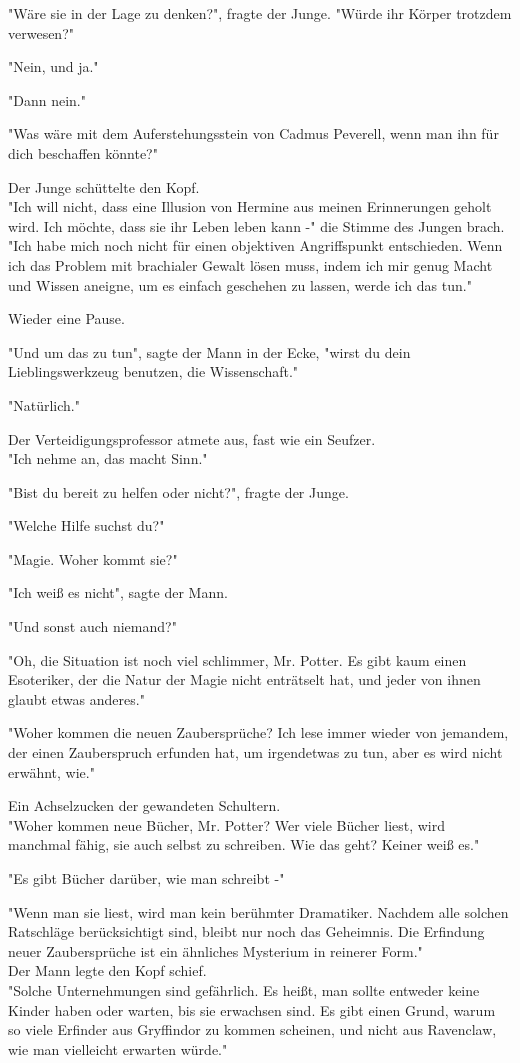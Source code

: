 {"Wäre sie in der Lage zu denken?", fragte der Junge. "Würde ihr Körper trotzdem verwesen?"

"Nein, und ja."

"Dann nein."

"Was wäre mit dem Auferstehungsstein von Cadmus Peverell, wenn man ihn für dich beschaffen könnte?"

Der Junge schüttelte den Kopf.\\ "Ich will nicht, dass eine Illusion von Hermine aus meinen Erinnerungen geholt wird. Ich möchte, dass sie ihr Leben leben kann -" die Stimme des Jungen brach. "Ich habe mich noch nicht für einen objektiven Angriffspunkt entschieden. Wenn ich das Problem mit brachialer Gewalt lösen muss, indem ich mir genug Macht und Wissen aneigne, um es einfach geschehen zu lassen, werde ich das tun."

Wieder eine Pause.

"Und um das zu tun", sagte der Mann in der Ecke, "wirst du dein Lieblingswerkzeug benutzen, die Wissenschaft."

"Natürlich."

Der Verteidigungsprofessor atmete aus, fast wie ein Seufzer.\\ "Ich nehme an, das macht Sinn."

"Bist du bereit zu helfen oder nicht?", fragte der Junge.

"Welche Hilfe suchst du?"

"Magie. Woher kommt sie?"

"Ich weiß es nicht", sagte der Mann.

"Und sonst auch niemand?"

"Oh, die Situation ist noch viel schlimmer, Mr. Potter. Es gibt kaum einen Esoteriker, der die Natur der Magie nicht enträtselt hat, und jeder von ihnen glaubt etwas anderes."

"Woher kommen die neuen Zaubersprüche? Ich lese immer wieder von jemandem, der einen Zauberspruch erfunden hat, um irgendetwas zu tun, aber es wird nicht erwähnt, wie."

Ein Achselzucken der gewandeten Schultern.\\ "Woher kommen neue Bücher, Mr. Potter? Wer viele Bücher liest, wird manchmal fähig, sie auch selbst zu schreiben. Wie das geht? Keiner weiß es."

"Es gibt Bücher darüber, wie man schreibt -"

"Wenn man sie liest, wird man kein berühmter Dramatiker. Nachdem alle solchen Ratschläge berücksichtigt sind, bleibt nur noch das Geheimnis. Die Erfindung neuer Zaubersprüche ist ein ähnliches Mysterium in reinerer Form."\\ Der Mann legte den Kopf schief.\\ "Solche Unternehmungen sind gefährlich. Es heißt, man sollte entweder keine Kinder haben oder warten, bis sie erwachsen sind. Es gibt einen Grund, warum so viele Erfinder aus Gryffindor zu kommen scheinen, und nicht aus Ravenclaw, wie man vielleicht erwarten würde."

}
